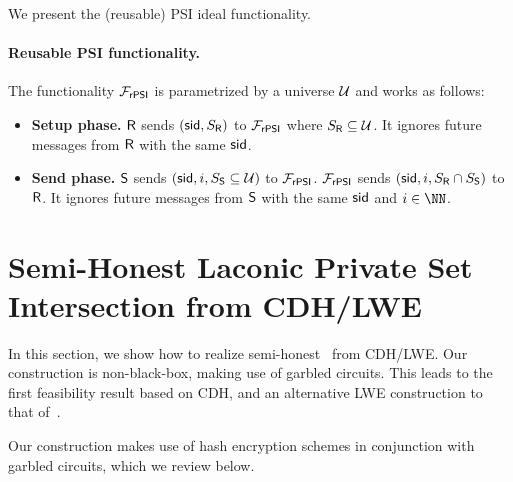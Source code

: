 
We present the (reusable) PSI ideal functionality.
\paragraph{Reusable PSI functionality.}  The functionality $\mathcal{F}_{\mathsf{rPSI}}$ is parametrized by a universe $\mathcal{U}$ and works as follows:
\begin{itemize}
    \item \textbf{Setup phase.} $\mathsf{R}$ sends $(\mathsf{sid},S_{\mathsf{R}})$ to  $\mathcal{F}_{\mathsf{rPSI}}$ where $S_{\mathsf{R}}\subseteq \mathcal{U}$. It ignores future messages from $\mathsf{R}$ with the same $\mathsf{sid}$.

  \item \textbf{Send phase.}
      $\mathsf{S}$ sends $\left (\mathsf{sid},i,S_{\mathsf{S}}\subseteq\mathcal{U} \right )$ to $\mathcal{F}_{\mathsf{rPSI}}$. $\mathcal{F}_{\mathsf{rPSI}}$ sends $(\mathsf{sid},i,S_{\mathsf{R}}\cap S_{\mathsf{S}})$ to $\mathsf{R}$. It  ignores future messages from $\mathsf{S}$ with the same $\mathsf{sid}$ and $i\in\NN$.
\end{itemize}






\section{Semi-Honest Laconic Private Set Intersection from CDH/LWE}
\label{sec:LPSIfromCDH}
In this section, we show how to realize semi-honest \ePSI~from CDH/LWE. Our construction is non-black-box, making use of garbled circuits. This leads to the first feasibility result based on CDH, and an alternative LWE construction to that of~\cite{FOCS:QuaWeeWic18}.

Our construction makes use of hash encryption schemes in conjunction with garbled circuits, which we review below. 


